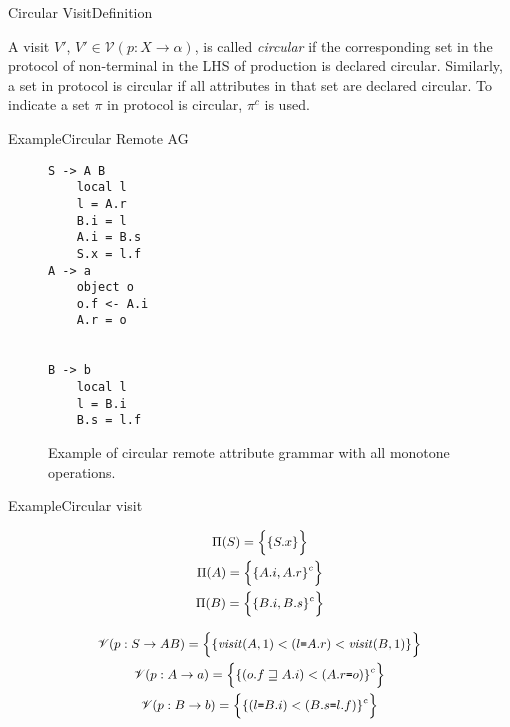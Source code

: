 \begin{frame}{Circular Visit}{Definition}

\begin{definition}\label{def:circular-set-of-occurances}
A visit $V'$, $V' \in \mathscr{V}(p: X \rightarrow \alpha)$, is called \emph{circular} if the corresponding set in the protocol of non-terminal in the LHS of production is declared circular. Similarly, a set in protocol is circular if all attributes in that set are declared circular. To indicate a set $\pi$ in protocol is circular, $\pi^c$ is used.
\end{definition}

\end{frame}



\begin{frame}[fragile=singleslide]{Example}{Circular Remote AG}


\begin{figure}
    \centering
\begin{multicols}{3}
\begin{Verbatim}[fontsize=\small]
S -> A B
    local l
    l = A.r
    B.i = l
    A.i = B.s
    S.x = l.f
A -> a
    object o
    o.f <- A.i
    A.r = o


B -> b
    local l
    l = B.i
    B.s = l.f
\end{Verbatim}
\end{multicols}
    \caption{Example of circular remote attribute grammar with all monotone operations.}
    \label{fig:crag-definition-with-all-monotone}
\end{figure}

\end{frame}


\begin{frame}{Example}{Circular visit}

\begin{equation}
\small
\begin{gathered}
\Pi(S) =  \Big \{   \{ S.x \}      \Big \} \\
\Pi(A) =  \Big \{   \{  A.i, A.r \}^c      \Big \} \\
\Pi(B) =  \Big \{   \{  B.i, B.s \}^c      \Big \}
\end{gathered}
\end{equation}

\begin{equation}
\small
\begin{gathered}
\mathscr{V}(p: S \rightarrow A B) = \Big \{  \{  \mathit{visit}(A, 1) <  (l \texttt{=} A.r) < \mathit{visit}(B, 1)  \}    \Big \} \\
\mathscr{V}(p: A \rightarrow a) = \Big \{  \{  (o.f \sqsupseteq A.i)  < (A.r \texttt{=} o)  \}^c    \Big \} \\
\mathscr{V}(p: B \rightarrow b) = \Big \{  \{  (l \texttt{=} B.i) < (B.s \texttt{=} l.f)  \}^c    \Big \}
\end{gathered}
\end{equation}


\end{frame}

